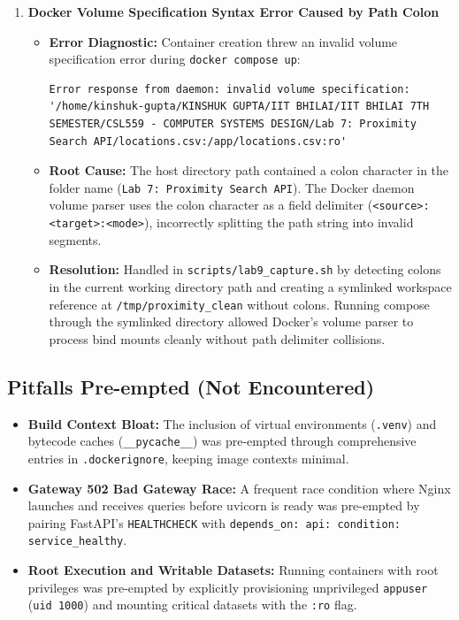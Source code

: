 \documentclass[10pt,a4paper]{article}
\begin{document}
\begin{enumerate}
    \item \textbf{Docker Volume Specification Syntax Error Caused by Path Colon}
    \begin{itemize}
        \item \textbf{Error Diagnostic:} Container creation threw an invalid volume specification error during \texttt{docker compose up}:
        \begin{lstlisting}
Error response from daemon: invalid volume specification: '/home/kinshuk-gupta/KINSHUK GUPTA/IIT BHILAI/IIT BHILAI 7TH SEMESTER/CSL559 - COMPUTER SYSTEMS DESIGN/Lab 7: Proximity Search API/locations.csv:/app/locations.csv:ro'
        \end{lstlisting}
        \item \textbf{Root Cause:} The host directory path contained a colon character in the folder name (\texttt{Lab 7: Proximity Search API}). The Docker daemon volume parser uses the colon character as a field delimiter (\texttt{<source>:<target>:<mode>}), incorrectly splitting the path string into invalid segments.
        \item \textbf{Resolution:} Handled in \texttt{scripts/lab9\_capture.sh} by detecting colons in the current working directory path and creating a symlinked workspace reference at \texttt{/tmp/proximity\_clean} without colons. Running compose through the symlinked directory allowed Docker's volume parser to process bind mounts cleanly without path delimiter collisions.
    \end{itemize}
\end{enumerate}

\subsection{Pitfalls Pre-empted (Not Encountered)}
\begin{itemize}
    \item \textbf{Build Context Bloat:} The inclusion of virtual environments (\texttt{.venv}) and bytecode caches (\texttt{\_\_pycache\_\_}) was pre-empted through comprehensive entries in \texttt{.dockerignore}, keeping image contexts minimal.
    \item \textbf{Gateway 502 Bad Gateway Race:} A frequent race condition where Nginx launches and receives queries before uvicorn is ready was pre-empted by pairing FastAPI's \texttt{HEALTHCHECK} with \texttt{depends\_on: api: condition: service\_healthy}.
    \item \textbf{Root Execution and Writable Datasets:} Running containers with root privileges was pre-empted by explicitly provisioning unprivileged \texttt{appuser} (\texttt{uid 1000}) and mounting critical datasets with the \texttt{:ro} flag.
\end{itemize}
\end{document}
